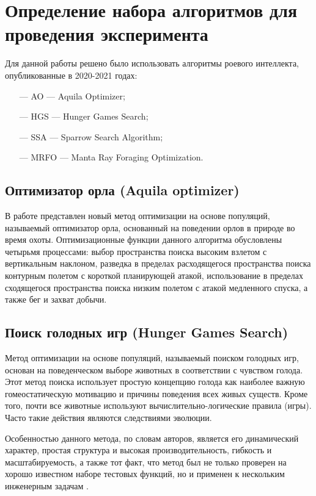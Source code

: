 \section{Определение набора алгоритмов для проведения эксперимента}\label{BIOAlgs}

Для данной работы решено было использовать алгоритмы роевого интеллекта, опубликованные в 2020-2021 годах:

\begin{itemize}
    \item[—] AO — Aquila Optimizer;
    \item[—] HGS — Hunger Games Search;
    \item[—] SSA — Sparrow Search Algorithm;
    \item[—] MRFO — Manta Ray Foraging Optimization.
\end{itemize}

\subsection{Оптимизатор орла (Aquila optimizer)}\label{AO}

В работе \cite{AO} представлен новый метод оптимизации на основе популяций, называемый оптимизатор орла,
основанный на поведении орлов в природе во время охоты. Оптимизационные функции
данного алгоритма обусловлены четырьмя процессами: выбор пространства поиска высоким
взлетом с вертикальным наклоном, разведка в пределах расходящегося пространства поиска
контурным полетом с короткой планирующей атакой, использование в пределах сходящегося пространства
поиска низким полетом с атакой медленного спуска, а также бег и захват добычи.

\subsection{Поиск голодных игр (Hunger Games Search)}\label{HGS}

Метод оптимизации на основе популяций, называемый поиском голодных игр, основан на поведенческом выборе
животных в соответствии с чувством голода. Этот метод поиска использует простую концепцию голода как наиболее
важную гомеостатическую мотивацию и причины поведения всех живых существ. Кроме того, почти все животные используют 
вычислительно-лог\-ические правила (игры). Часто такие действия являются следствиями эволюции.

Особенностью данного метода, по словам авторов, является его динамический характер, простая структура и
высокая производительность, гибкость и масштабируемость, а также тот факт, что метод был не только
проверен на хорошо известном наборе тестовых функций, но и применен к нескольким инженерным задачам \cite{HGS}.

